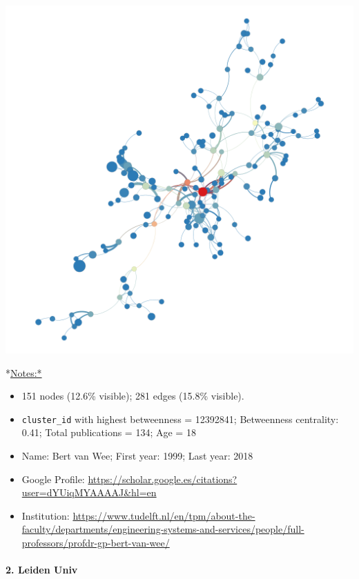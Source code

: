 \documentclass[]{article}
\providecommand{\tightlist}{%
  \setlength{\itemsep}{0pt}\setlength{\parskip}{0pt}}
\let\oldparagraph\paragraph
\renewcommand{\paragraph}[1]{\oldparagraph{#1}\mbox{}}
\begin{document}
\includegraphics{figs/tu_soc_betweenness.png}

*\url{Notes:*}

\begin{itemize}
\tightlist
\item
  151 nodes (12.6\% visible); 281 edges (15.8\% visible).
\item
  \texttt{cluster\_id} with highest betweenness = 12392841; Betweenness
  centrality: 0.41; Total publications = 134; Age = 18
\item
  Name: Bert van Wee; First year: 1999; Last year: 2018
\item
  Google Profile:
  \url{https://scholar.google.es/citations?user=dYUiqMYAAAAJ\&hl=en}
\item
  Institution:
  \url{https://www.tudelft.nl/en/tpm/about-the-faculty/departments/engineering-systems-and-services/people/full-professors/profdr-gp-bert-van-wee/}
\end{itemize}

\paragraph{2. Leiden Univ}\label{leiden-univ-2}
\end{document}
